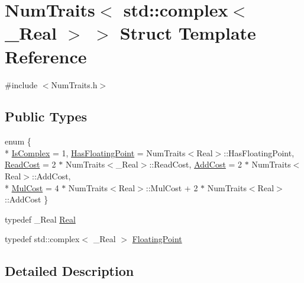 \hypertarget{struct_num_traits_3_01std_1_1complex_3_01___real_01_4_01_4}{\section{Num\-Traits$<$ std\-:\-:complex$<$ \-\_\-\-Real $>$ $>$ Struct Template Reference}
\label{struct_num_traits_3_01std_1_1complex_3_01___real_01_4_01_4}
}


{\ttfamily \#include $<$Num\-Traits.\-h$>$}

\subsection*{Public Types}
\begin{DoxyCompactItemize}
\item 
enum \{ \\*
\hyperlink{struct_num_traits_3_01std_1_1complex_3_01___real_01_4_01_4_a871ff18c5ca0e6b22d90410aaf6b96c4ae56e76aa1c54074f275a3d252ad2cc6b}{Is\-Complex} = 1, 
\hyperlink{struct_num_traits_3_01std_1_1complex_3_01___real_01_4_01_4_a871ff18c5ca0e6b22d90410aaf6b96c4a7f1de14743e1fc401a2ba3805c737bee}{Has\-Floating\-Point} = Num\-Traits$<$Real$>$\-:\-:Has\-Floating\-Point, 
\hyperlink{struct_num_traits_3_01std_1_1complex_3_01___real_01_4_01_4_a871ff18c5ca0e6b22d90410aaf6b96c4a302218b4f661b02b49fd1d26aa66eb45}{Read\-Cost} = 2 $\ast$ Num\-Traits$<$\-\_\-\-Real$>$\-:\-:Read\-Cost, 
\hyperlink{struct_num_traits_3_01std_1_1complex_3_01___real_01_4_01_4_a871ff18c5ca0e6b22d90410aaf6b96c4a10d14e7883002df66df773824785c86b}{Add\-Cost} = 2 $\ast$ Num\-Traits$<$Real$>$\-:\-:Add\-Cost, 
\\*
\hyperlink{struct_num_traits_3_01std_1_1complex_3_01___real_01_4_01_4_a871ff18c5ca0e6b22d90410aaf6b96c4a4adb121abc42ede778cae2652809088a}{Mul\-Cost} = 4 $\ast$ Num\-Traits$<$Real$>$\-:\-:Mul\-Cost + 2 $\ast$ Num\-Traits$<$Real$>$\-:\-:Add\-Cost
 \}
\item 
typedef \-\_\-\-Real \hyperlink{struct_num_traits_3_01std_1_1complex_3_01___real_01_4_01_4_a8613be7f43ebabd44fe024bdc30457a1}{Real}
\item 
typedef std\-::complex$<$ \-\_\-\-Real $>$ \hyperlink{struct_num_traits_3_01std_1_1complex_3_01___real_01_4_01_4_a57d3835addbd57cbaaf1ad0872595dec}{Floating\-Point}
\end{DoxyCompactItemize}


\subsection{Detailed Description}
